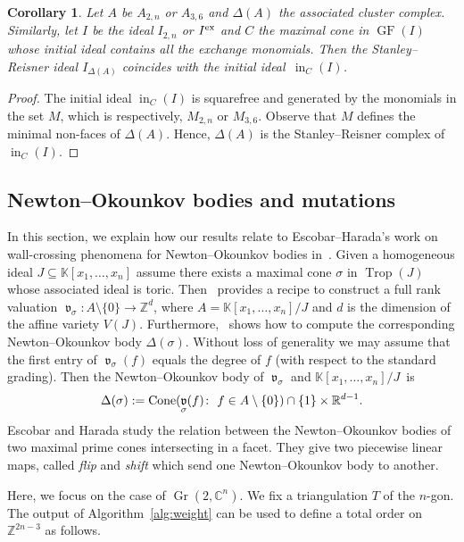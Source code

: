 \documentclass[10pt,a4paper]{amsart}
\newcommand{\thlabel}[1]{\label{#1}}
\newtheorem{Corollary}[Theorem]{Corollary}
\numberwithin{equation}{section}
\DeclareMathOperator{\init}{in}
\DeclareMathOperator{\Gr}{Gr}
\DeclareMathOperator{\GF}{GF}
\DeclareMathOperator{\trop}{Trop}
\DeclareMathOperator{\val}{\mathfrak v}
\begin{document}
\begin{Corollary}\thlabel{cor:Stanley-Reisner}
Let $A$ be $A_{2,n}$ or $A_{3,6}$ and $\Delta(A)$ the associated cluster complex.
Similarly, let $I$ be the ideal $I_{2,n}$ or $I^{\rm ex}$ and $C$ the maximal cone in $\GF(I)$ whose initial ideal contains all the exchange monomials.
Then the Stanley--Reisner ideal $I_{\Delta(A)}$ coincides with the initial ideal~$\init_C(I)$.
\end{Corollary}
\begin{proof}
The initial ideal $\init_C(I)$ is squarefree and generated by the monomials in the set $M$, which is respectively, $M_{2,n}$ or $M_{3,6}$.
Observe that $M$ defines the minimal non-faces of $\Delta(A)$.
Hence, $\Delta(A)$ is the Stanley--Reisner complex of $\init_C(I)$.
\end{proof}


\subsection{Newton--Okounkov bodies and mutations}\label{sec:NO}

In this section, we explain how our results relate to Escobar--Harada's work on wall-crossing phenomena for Newton--Okounkov bodies in~\cite{EH-NObodies}.
Given a homogeneous ideal $J\subseteq \mathbb K[x_1,\dots,x_n]$ assume there exists a maximal cone $\sigma$ in $\trop(J)$ whose associated ideal is toric.
Then~\cite[Section~4]{KM16} provides a recipe to construct a full rank valuation $\val_\sigma\colon A\setminus \{0\}\to \mathbb Z^{d}$, where $A=\mathbb K[x_1,\dots,x_n]/J$ and $d$ is the dimension of the affine variety $V(J)$.
Furthermore,~\cite[Corollary~4.7]{KM16} shows how to compute the corresponding Newton--Okounkov body $\Delta(\sigma)$. Without loss of generality we may assume that the first entry of $\val_\sigma(f)$ equals the degree of $f$ (with respect to the standard grading). Then the Newton--Okounkov body of $\val_\sigma$ and $\mathbb K[x_1,\dots,x_n]/J$~is
\begin{displaymath}
\Delta(\sigma):={\rm Cone}(\val_\sigma(f)\colon \ f\in A\setminus \{0\}) \cap \{1\}\times \mathbb R^{d-1}.
\end{displaymath}
Escobar and Harada study the relation between the Newton--Okounkov bodies of two maximal prime cones intersecting in a facet.
They give two piecewise linear maps, called {\it flip} and {\it shift} which send one Newton--Okounkov body to another.


Here, we focus on the case of $\Gr(2,\mathbb C^n)$.
We fix a triangulation $T$ of the $n$-gon.
The output of Algorithm~\ref{alg:weight} can be used to define a total order on $\mathbb Z^{2n-3}$ as follows.
\end{document}
